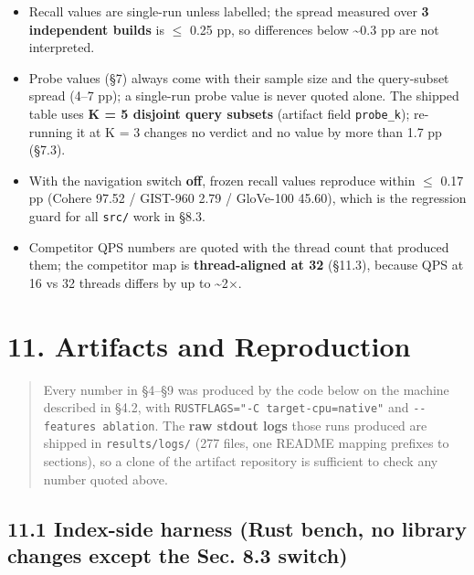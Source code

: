 \documentclass[
  10pt,
]{article}
\providecommand{\tightlist}{%
  \setlength{\itemsep}{0pt}\setlength{\parskip}{0pt}}
\begin{document}
\begin{itemize}
\tightlist
\item
  Recall values are single-run unless labelled; the spread measured over
  \textbf{3 independent builds} is $\leq$ 0.25 pp, so differences below
  \textasciitilde0.3 pp are not interpreted.
\item
  Probe values (§7) always come with their sample size and the
  query-subset spread (4--7 pp); a single-run probe value is never
  quoted alone. The shipped table uses \textbf{K = 5 disjoint query
  subsets} (artifact field \texttt{probe\_k}); re-running it at K = 3
  changes no verdict and no value by more than 1.7 pp (§7.3).
\item
  With the navigation switch \textbf{off}, frozen recall values
  reproduce within $\leq$ 0.17 pp (Cohere 97.52 / GIST-960 2.79 / GloVe-100
  45.60), which is the regression guard for all \texttt{src/} work in
  §8.3.
\item
  Competitor QPS numbers are quoted with the thread count that produced
  them; the competitor map is \textbf{thread-aligned at 32} (§11.3),
  because QPS at 16 vs 32 threads differs by up to \textasciitilde2$\times$.
\end{itemize}

\section{11. Artifacts and
Reproduction}\label{artifacts-and-reproduction}

\begin{quote}
Every number in §4--§9 was produced by the code below on the machine
described in §4.2, with \texttt{RUSTFLAGS="-C\ target-cpu=native"} and
\texttt{-\/-features\ ablation}. The \textbf{raw stdout logs} those runs
produced are shipped in \texttt{results/logs/} (277 files, one README
mapping prefixes to sections), so a clone of the artifact repository is
sufficient to check any number quoted above.
\end{quote}

\subsection{11.1 Index-side harness (Rust bench, no library changes
except the Sec. 8.3
switch)}\label{index-side-harness-rust-bench-no-library-changes-except-the-sec.-8.3-switch}
\end{document}
